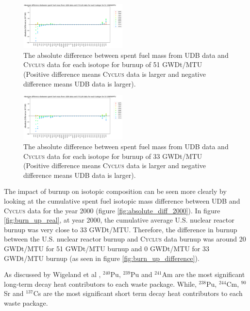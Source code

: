 \documentclass{anstrans}
\newcommand{\Cyclus}{\textsc{Cyclus}\xspace}%
\begin{document}
\begin{figure}[t] %
	\centering
	\includegraphics[width=0.48\textwidth]{figures/absolute_diff_all_51}
	\caption{The absolute difference between spent fuel mass from UDB data and \Cyclus data for each isotope for burnup of 51 GWDt/MTU (Positive difference means \Cyclus data is larger and negative difference means UDB data is larger).}
	\label{fig:absolute_diff_all_51}
\end{figure} 

\begin{figure}[t] %
	\centering
	\includegraphics[width=0.48\textwidth]{figures/absolute_diff_all_33}
	\caption{The absolute difference between spent fuel mass from UDB data and \Cyclus data for each isotope for burnup of 33 GWDt/MTU (Positive difference means \Cyclus data is larger and negative difference means UDB data is larger).}
	\label{fig:absolute_diff_all_33}
\end{figure} 

The impact of burnup on isotopic composition can be seen more clearly by 
looking at the cumulative spent fuel isotopic mass difference between UDB and 
\Cyclus data for the year 2000 (figure \ref{fig:absolute_diff_2000}). In figure 
\ref{fig:burn_up_real}, at year 2000, the cumulative average U.S. nuclear 
reactor burnup was very close to 33 GWDt/MTU. Therefore, the difference in 
burnup between the U.S. nuclear reactor burnup and \Cyclus data burnup was 
around 20 GWDt/MTU for 51 GWDt/MTU burnup and 0 GWDt/MTU for 33 GWDt/MTU burnup 
(as seen in figure \ref{fig:burn_up_difference}). 

As discussed by Wigeland et al \cite{wigeland_separations_2006}, $^{240}$Pu, 
$^{239}$Pu and $^{241}$Am are the most significant long-term decay heat 
contributors to each waste package. While, $^{238}$Pu, $^{244}$Cm, $^{90}$Sr 
and $^{137}$Cs are the most significant short term decay heat contributors 
\cite{wigeland_separations_2006} to each waste package. 
\end{document}
